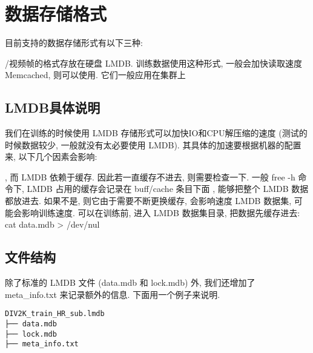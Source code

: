 \documentclass[../main.tex]{subfiles}
\begin{document}
\section{数据存储格式}\label{data_preparation:data_format}


目前支持的数据存储形式有以下三种:
\begin{enumerate}
/视频帧的格式存放在硬盘
 LMDB. 训练数据使用这种形式, 一般会加快读取速度
 Memcached, 则可以使用. 它们一般应用在集群上
\end{enumerate}

\subsection{LMDB具体说明}

我们在训练的时候使用 LMDB 存储形式可以加快IO和CPU解压缩的速度 (测试的时候数据较少, 一般就没有太必要使用 LMDB). 其具体的加速要根据机器的配置来, 以下几个因素会影响:
\begin{enumerate}
, 而 LMDB 依赖于缓存. 因此若一直缓存不进去, 则需要检查一下. 一般 free -h 命令下, LMDB 占用的缓存会记录在 buff/cache 条目下面
, 能够把整个 LMDB 数据都放进去. 如果不是, 则它由于需要不断更换缓存, 会影响速度
 LMDB 数据集, 可能会影响训练速度. 可以在训练前, 进入 LMDB 数据集目录, 把数据先缓存进去: cat data.mdb > /dev/nul
\end{enumerate}

\subsection{文件结构}

除了标准的 LMDB 文件 (data.mdb 和 lock.mdb) 外, 我们还增加了 
 meta\_info.txt 来记录额外的信息. 下面用一个例子来说明.

\begin{verbatim}
DIV2K_train_HR_sub.lmdb
├── data.mdb
├── lock.mdb
├── meta_info.txt
\end{verbatim}

\end{document}
